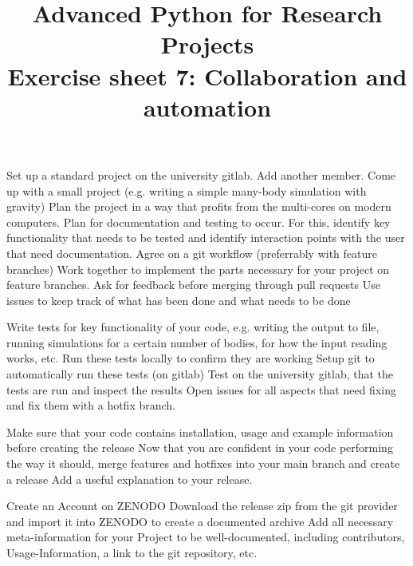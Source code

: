 \documentclass[]{erlangen-problemset}
\title{{\Large Advanced Python for Research Projects} \\[0.3cm] 
Exercise sheet 7: Collaboration and automation}
\begin{document}


\begin{problem}[title={Working with other members}]
\noindent
\Question Set up a standard project on the university gitlab.
\Question Add another member.
\Question Come up with a small project (e.g. writing a simple many-body simulation with gravity)
\Question Plan the project in a way that profits from the multi-cores on modern computers. Plan for documentation and testing to occur. 
For this, identify key functionality that needs to be tested and identify interaction points with the user that need documentation.
\Question Agree on a git workflow (preferrably with feature branches)
\Question Work together to implement the parts necessary for your project on feature branches. Ask for feedback before merging through pull requests
\Question Use issues to keep track of what has been done and what needs to be done
\end{problem}

\begin{problem}[title={Automated testing}]
\noindent
\Question Write tests for key functionality of your code, e.g. writing the output to file, running simulations for a certain number of bodies, for how the input reading works, etc.
\Question Run these tests locally to confirm they are working
\Question Setup git to automatically run these tests (on gitlab)
\Question Test on the university gitlab, that the tests are run and inspect the results
\Question Open issues for all aspects that need fixing and fix them with a hotfix branch. 
\end{problem}

\begin{problem}[title={Creating a release}]
\noindent
\Question Make sure that your code contains installation, usage and example information before creating the release
\Question Now that you are confident in your code performing the way it should, merge features and hotfixes into your main branch and create a release
\Question Add a useful explanation to your release.
\end{problem}

\begin{problem}[title={FAIR principles}]
\noindent
\Question Create an Account on ZENODO
\Question Download the release zip from the git provider and import it into ZENODO to create a documented archive
\Question Add all necessary meta-information for your Project to be well-documented, including contributors, Usage-Information, a link to the git repository, etc. 
\end{problem}
\end{document}
